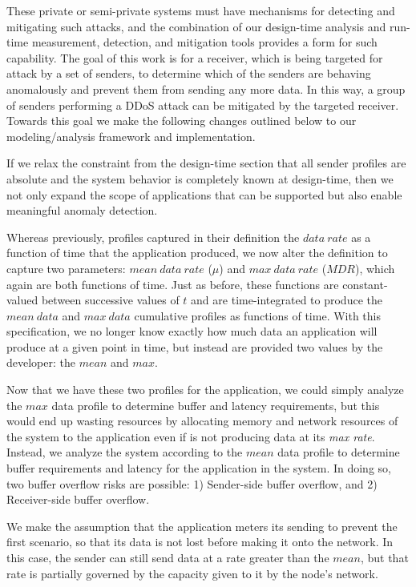 These private or semi-private systems must have mechanisms for
detecting and mitigating such attacks, and the combination of our
design-time analysis and run-time measurement, detection, and
mitigation tools provides a form for such capability.  The goal of
this work is for a receiver, which is being targeted for attack by a
set of senders, to determine which of the senders are behaving
anomalously and prevent them from sending any more data.  In this way,
a group of senders performing a DDoS attack can be mitigated by the
targeted receiver.  Towards this goal we make the following changes
outlined below to our modeling/analysis framework and implementation.

If we relax the constraint from the design-time section that all
sender profiles are absolute and the system behavior is completely
known at design-time, then we not only expand the scope of
applications that can be supported but also enable meaningful anomaly
detection.

Whereas previously, profiles captured in their definition the
$data\ rate$ as a function of time that the application
produced, we now alter the definition to capture two parameters:
$mean\ data\ rate$ ($\mu$) and $max\ data\ rate$
($MDR$), which again are both functions of time.  Just as
before, these functions are constant-valued between successive values
of $t$ and are time-integrated to produce the $mean\ data$
and $max\ data$ cumulative profiles as functions of time.  With
this specification, we no longer know exactly how much data an
application will produce at a given point in time, but instead are
provided two values by the developer: the $mean$ and
$max$.

Now that we have these two profiles for the application, we could
simply analyze the $max$ data profile to determine buffer and latency
requirements, but this would end up wasting resources by allocating
memory and network resources of the system to the application even if
is not producing data at its \emph{max rate}.  Instead, we analyze the
system according to the $mean$ data profile to determine buffer
requirements and latency for the application in the system.  In doing
so, two buffer overflow risks are possible: 1) Sender-side buffer
overflow, and 2) Receiver-side buffer overflow.

We make the assumption that the application meters its sending to
prevent the first scenario, so that its data is not lost before making
it onto the network.  In this case, the sender can still send data at
a rate greater than the $mean$, but that rate is partially
governed by the capacity given to it by the node's network.


